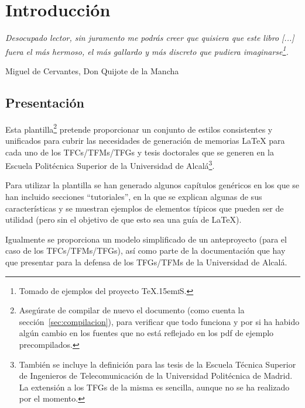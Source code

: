 \documentclass[spanish,openright]{book}
\def\texis{\TeX \raise.15em\hbox{\textsc{i}}S}
\newenvironment{FraseCelebre}{\begin{list}{}{\setlength{\leftmargin}{0.5\textwidth}\setlength{\parsep}{0cm}\addtolength{\topsep}{0.5cm}}
  }
  {\unskip \end{list}}
\newenvironment{Frase}{\item \begin{flushright}\small\em}{\end{flushright}}
\newenvironment{Fuente}{\item \begin{flushright}\small}{\end{flushright}}
\begin{document}
\chapter{Introducción}
\label{cha:introduccion}

\begin{FraseCelebre}
  \begin{Frase}
    Desocupado lector, sin juramento me podrás creer que quisiera que este
    libro [...] fuera el más hermoso, el más gallardo y más discreto que
    pudiera imaginarse\footnote{Tomado de ejemplos del proyecto \texis{}.}.
  \end{Frase}
  \begin{Fuente}
    Miguel de Cervantes, Don Quijote de la Mancha
  \end{Fuente}
\end{FraseCelebre}


\section{Presentación}
\label{sec:presentacion}


Esta plantilla\footnote{Asegúrate de compilar de nuevo el documento
  (como cuenta la sección~\ref{sec:compilacion}), para verificar que
  todo funciona y por si ha habido algún cambio en los fuentes que no
  está reflejado en los pdf de ejemplo precompilados.} pretende
proporcionar un conjunto de estilos consistentes y unificados para
cubrir las necesidades de generación de memorias \LaTeX{} para cada uno
de los TFCs/TFMs/TFGs y tesis doctorales que se generen en la Escuela
Politécnica Superior de la Universidad de Alcalá\footnote{También se
  incluye la definición para las tesis de la Escuela Técnica Superior de
  Ingenieros de Telecomunicación de la Universidad Politécnica de
  Madrid. La extensión a los TFGs de la misma es sencilla, aunque no se
  ha realizado por el momento.}.

Para utilizar la plantilla se han generado algunos capítulos genéricos
en los que se han incluido secciones ``tutoriales'', en la que se
explican algunas de sus características y se muestran ejemplos de
elementos típicos que pueden ser de utilidad (pero sin el objetivo de
que esto sea una guía de \LaTeX{}).

Igualmente se proporciona un modelo simplificado de un anteproyecto
(para el caso de los TFCs/TFMs/TFGs), así como parte de la documentación
que hay que presentar para la defensa de los TFGs/TFMs de la Universidad
de Alcalá.
\end{document}
